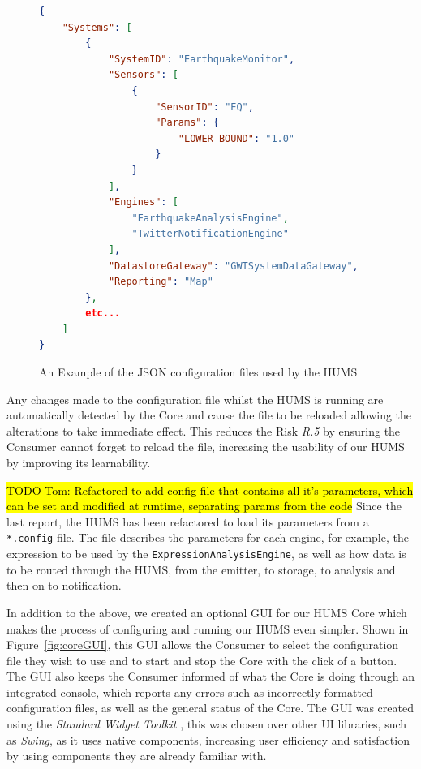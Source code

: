 \documentclass[10pt,a4paper]{article}
\begin{document}
\begin{figure}[tbp]
\begin{lstlisting}[language=json,firstnumber=1]
{
    "Systems": [
        {
            "SystemID": "EarthquakeMonitor",
            "Sensors": [
                {
                    "SensorID": "EQ",
                    "Params": {
                        "LOWER_BOUND": "1.0"
                    }
                }
            ],
            "Engines": [
                "EarthquakeAnalysisEngine",
                "TwitterNotificationEngine"
            ],
            "DatastoreGateway": "GWTSystemDataGateway",
            "Reporting": "Map"
        },
        etc...
    ]
}
\end{lstlisting}
\caption{An Example of the JSON configuration files used by the HUMS}
\label{fig:configFiles}
\end{figure}

Any changes made to the configuration file whilst the HUMS is running are automatically detected by the Core and cause the file to be reloaded allowing the alterations to take immediate effect. This reduces the Risk \emph{R.5} by ensuring the Consumer cannot forget to reload the file, increasing the usability of our HUMS by improving its learnability.

\hl{TODO Tom: Refactored to add config file that contains all it's parameters, which can be set and modified at runtime, separating params from the code}
Since the last report, the HUMS has been refactored to load its parameters from a \texttt{*.config} file. The file describes the parameters for each engine, for example, the expression to be used by the \texttt{ExpressionAnalysisEngine}, as well as how data is to be routed through the HUMS, from the emitter, to storage, to analysis and then on to notification.

In addition to the above, we created an optional GUI for our HUMS Core which makes the process of configuring and running our HUMS even simpler. Shown in Figure~\ref{fig:coreGUI}, this GUI allows the Consumer to select the configuration file they wish to use and to start and stop the Core with the click of a button. The GUI also keeps the Consumer informed of what the Core is doing through an integrated console, which reports any errors such as incorrectly formatted configuration files, as well as the general status of the Core. The GUI was created using the \emph{Standard Widget Toolkit} \cite{swt}, this was chosen over other UI libraries, such as \emph{Swing}, as it uses native components, increasing user efficiency and satisfaction by using components they are already familiar with.
\end{document}
